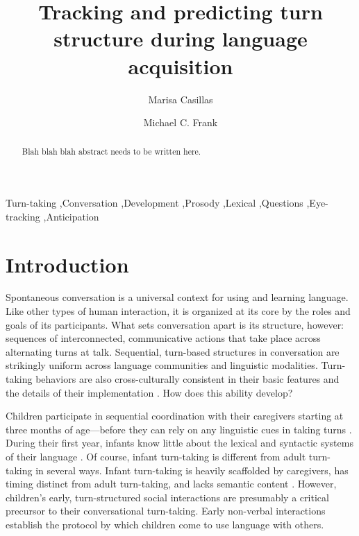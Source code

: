 \documentclass[authoryear, 12pt]{elsarticle}
\begin{document}
\begin{frontmatter}

\title{Tracking and predicting turn structure during language acquisition}

\author[MPI]{Marisa Casillas}
\address[MPI]{Max Planck Institute for Psycholinguistics, Nijmegen}

\author[StanfordPSY]{Michael C. Frank}

\address[StanfordPSY]{Department of Psychology, Stanford University}

\begin{abstract}
Blah blah blah abstract needs to be written here.

\end{abstract}

\begin{keyword}
Turn-taking \sep Conversation \sep Development \sep Prosody \sep Lexical \sep Questions \sep Eye-tracking \sep Anticipation

\end{keyword}

\end{frontmatter}


\section{Introduction}
\label{sec:intro}

Spontaneous conversation is a universal context for using and learning language. Like other types of human interaction, it is organized at its core by the roles and goals of its participants. What sets conversation apart is its structure, however: sequences of interconnected, communicative actions that take place across alternating turns at talk. Sequential, turn-based structures in conversation are strikingly uniform across language communities and linguistic modalities. Turn-taking behaviors are also cross-culturally consistent in their basic features and the details of their implementation \citep{stivers2009, dingemanse2013, de-vosInPrep}. How does this ability develop? 

Children participate in sequential coordination with their caregivers starting at three months of age---before they can rely on any linguistic cues in taking turns \citep{snow1977, jaffe2001, hilbrinkInPrep}. During their first year, infants know little about the lexical and syntactic systems of their language \citep[though they \textit{do} know a little about prosody;][]{christophe2001, bertoncini2013}. Of course, infant turn-taking is different from adult turn-taking in several ways. Infant turn-taking is heavily scaffolded by caregivers, has timing distinct from adult turn-taking, and lacks semantic content \citep{hilbrinkInPrep, jaffe2001, snow1977}. However, children's early, turn-structured social interactions are presumably a critical precursor to their conversational turn-taking. Early non-verbal interactions establish the protocol by which children come to use language with others. 
\end{document}
